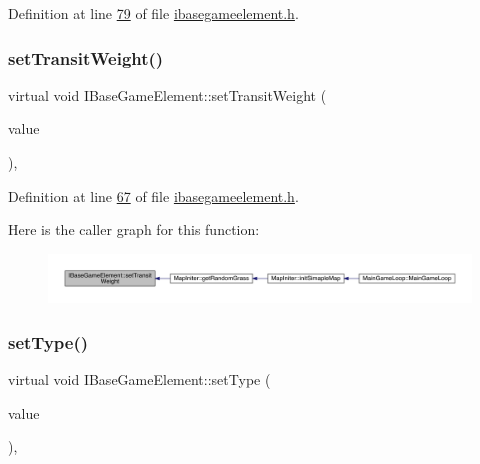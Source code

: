 Definition at line \hyperlink{a00047_source_l00079}{79} of file \hyperlink{a00047_source}{ibasegameelement.\+h}.

\mbox{\label{a00137_ac480b8140b5b290f49b4b96a47291180}} 
\subsubsection{\texorpdfstring{set\+Transit\+Weight()}{setTransitWeight()}}
{\footnotesize\ttfamily virtual void I\+Base\+Game\+Element\+::set\+Transit\+Weight (\begin{DoxyParamCaption}\item[{\hyperlink{a00161}{Infinity\+Double} $\ast$}]{value }\end{DoxyParamCaption})\hspace{0.3cm}{\ttfamily [inline]}, {\ttfamily [virtual]}}



Definition at line \hyperlink{a00047_source_l00067}{67} of file \hyperlink{a00047_source}{ibasegameelement.\+h}.

Here is the caller graph for this function\+:
\nopagebreak
\begin{figure}[H]
\begin{center}
\leavevmode
\includegraphics[width=350pt]{d2/df5/a00137_ac480b8140b5b290f49b4b96a47291180_icgraph}
\end{center}
\end{figure}
\mbox{\label{a00137_a324cba2176155a50b5a2239eb0a8b6a0}} 
\subsubsection{\texorpdfstring{set\+Type()}{setType()}}
{\footnotesize\ttfamily virtual void I\+Base\+Game\+Element\+::set\+Type (\begin{DoxyParamCaption}\item[{int}]{value }\end{DoxyParamCaption})\hspace{0.3cm}{\ttfamily [inline]}, {\ttfamily [virtual]}}



